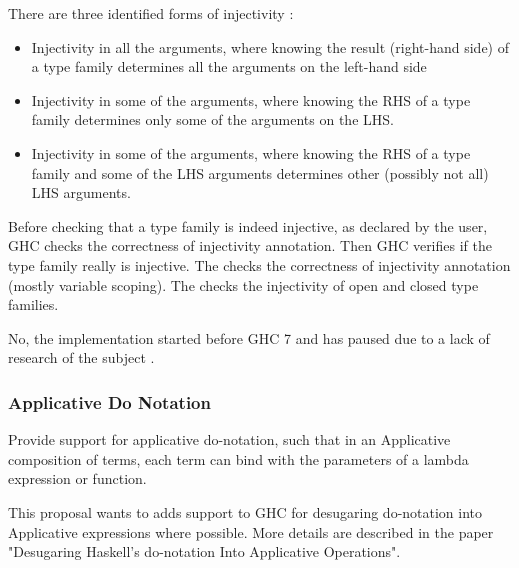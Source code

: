 There are three identified forms of injectivity  \cite{wiki}:

\begin{itemize}
    \item Injectivity in all the arguments, where knowing the result (right-hand side) of a type family determines all the arguments on the left-hand side
    \item Injectivity in some of the arguments, where knowing the RHS of a type family determines only some of the arguments on the LHS.
    \item Injectivity in some of the arguments, where knowing the RHS of a type family and some of the LHS arguments determines other (possibly not all) LHS arguments.
\end{itemize}

Before checking that a type family is indeed injective, as declared by the user, GHC checks the correctness of injectivity annotation. Then GHC verifies if the type family really is injective. The  checks the correctness of injectivity annotation (mostly variable scoping). The  checks the injectivity of open and closed type families.

\begin{new}
No, the implementation started before GHC 7 and has paused due to a lack of research of the subject  \cite{wiki}. 
\end{new}


\subsubsection{Applicative Do Notation}
\label{sec::sec::sec::applicative::do::notation}

\begin{requirement}
Provide support for applicative do-notation, such that in an Applicative composition of terms, each term can bind with the parameters of a lambda expression or function. 
\end{requirement}

\begin{wanted}
This proposal wants to adds support to GHC for desugaring do-notation into Applicative expressions where possible. More details are described in the paper "Desugaring Haskell’s do-notation Into Applicative Operations".
\end{wanted}

